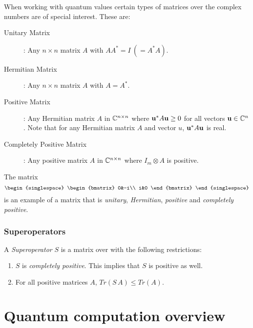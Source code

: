 When working with quantum values certain types of matrices over the complex numbers are of special
interest. These are:
\begin{description}
  \item[Unitary Matrix]: Any $n \times n$  matrix $A$ with $A A^{*} = I\ (= A^{*} A)$.
  \item[Hermitian Matrix]: Any  $n \times n$ matrix $A$ with $A=A^{*}$.
  \item[Positive Matrix]: Any Hermitian matrix $A$ in  $\mathbb{C}^{n\times n}$
    where $\mathbf{u}^{*} A \mathbf{u} \ge 0$ for all vectors  $\mathbf{u}\in \mathbb{C}^n$. Note
    that for any Hermitian matrix $A$ and vector $u$,  $\mathbf{u}^{*} A \mathbf{u}$ is real.
  \item[Completely Positive Matrix]: Any positive matrix $A$ in  $\mathbb{C}^{n\times n}$
    where $I_m \otimes A$ is positive.
\end{description}
The matrix
  \[
    {\begin{singlespace}
      \begin{bmatrix}
        0&-i\\
        i&0
      \end{bmatrix}
    \end{singlespace}}
  \]
is an example of a matrix that is \emph{unitary}, \emph{Hermitian}, \emph{positive} and
\emph{completely positive}.



\subsubsection{Superoperators} %
\label{ssub:superoperators}

A \emph{Superoperator} $S$ is a matrix over \complex{} with the following restrictions:
\begin{enumerate}
  \item{} $S$ is \emph{completely positive}. This implies that $S$ is positive as well.
  \item{} For all positive matrices $A$, $Tr(S\,A) \leq Tr(A)$.
\end{enumerate}



\section{Quantum computation overview} %
\label{sec:quantum_computation_overview}

